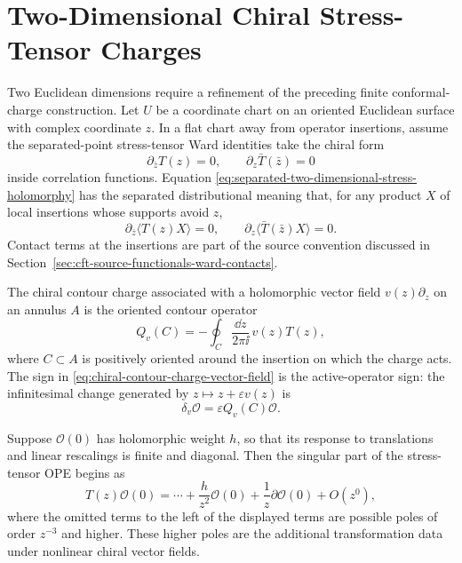 \section{Two-Dimensional Chiral Stress-Tensor Charges}
\label{sec:two-dimensional-chiral-stress-tensor-charges}

Two Euclidean dimensions require a refinement of the preceding finite
conformal-charge construction.  Let \(U\) be a coordinate chart on an oriented
Euclidean surface with complex coordinate \(z\).  In a flat chart away from
operator insertions, assume the separated-point stress-tensor Ward identities
take the chiral form
\begin{equation}
  \partial_{\bar z}T(z)=0,\qquad
  \partial_z\bar T(\bar z)=0
  \label{eq:separated-two-dimensional-stress-holomorphy}
\end{equation}
inside correlation functions.  Equation
\eqref{eq:separated-two-dimensional-stress-holomorphy} has the separated
distributional meaning that, for any product \(X\) of local insertions whose
supports avoid \(z\),
\[
  \partial_{\bar z}\langle T(z)X\rangle=0,\qquad
  \partial_z\langle \bar T(\bar z)X\rangle=0 .
\]
Contact terms at the insertions are part of the source convention discussed
in Section~\ref{sec:cft-source-functionals-ward-contacts}.

\begin{definition}
\label{def:chiral-stress-tensor-contour-charge}
The chiral
contour charge associated with a holomorphic vector field \(v(z)\partial_z\)
on an annulus \(A\) is the oriented contour operator
\begin{equation}
  Q_v(C)
  =
  -\oint_C\frac{\dd z}{2\pi\ii}\,v(z)T(z),
  \label{eq:chiral-contour-charge-vector-field}
\end{equation}
where \(C\subset A\) is positively oriented around the insertion on which the
charge acts.  The sign in \eqref{eq:chiral-contour-charge-vector-field} is
the active-operator sign: the infinitesimal change generated by
\(z\mapsto z+\varepsilon v(z)\) is
\[
  \delta_v\mathcal O
  =
  \varepsilon Q_v(C)\mathcal O .
\]
\end{definition}

Suppose \(\mathcal O(0)\) has holomorphic weight \(h\), so that its response
to translations and linear rescalings is finite and diagonal.  Then the
singular part of the stress-tensor OPE begins as
\begin{equation}
  T(z)\mathcal O(0)
  =
  \cdots
  +
  \frac{h}{z^2}\mathcal O(0)
  +
  \frac1z\partial\mathcal O(0)
  +O(z^0),
  \label{eq:stress-ope-weight-translation-terms}
\end{equation}
where the omitted terms to the left of the displayed terms are possible poles
of order \(z^{-3}\) and higher.  These higher poles are the additional
transformation data under nonlinear chiral vector fields.

